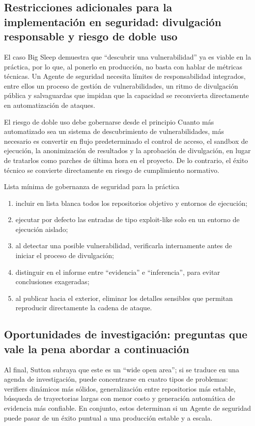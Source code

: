 \subsection{Restricciones adicionales para la implementación en seguridad: divulgación responsable y riesgo de doble uso}
El caso Big Sleep demuestra que ``descubrir una vulnerabilidad'' ya es viable en la práctica, por lo que, al ponerlo en producción, no basta con hablar de métricas técnicas. Un Agente de seguridad necesita límites de responsabilidad integrados, entre ellos un proceso de gestión de vulnerabilidades, un ritmo de divulgación pública y salvaguardas que impidan que la capacidad se reconvierta directamente en automatización de ataques.

\begin{warningbox}{El riesgo de doble uso debe gobernarse desde el principio}
Cuanto más automatizado sea un sistema de descubrimiento de vulnerabilidades, más necesario es convertir en flujo predeterminado el control de acceso, el sandbox de ejecución, la anonimización de resultados y la aprobación de divulgación, en lugar de tratarlos como parches de última hora en el proyecto. De lo contrario, el éxito técnico se convierte directamente en riesgo de cumplimiento normativo.
\end{warningbox}

\begin{importantbox}{Lista mínima de gobernanza de seguridad para la práctica}
\begin{enumerate}
    \item incluir en lista blanca todos los repositorios objetivo y entornos de ejecución;
    \item ejecutar por defecto las entradas de tipo exploit-like solo en un entorno de ejecución aislado;
    \item al detectar una posible vulnerabilidad, verificarla internamente antes de iniciar el proceso de divulgación;
    \item distinguir en el informe entre ``evidencia'' e ``inferencia'', para evitar conclusiones exageradas;
    \item al publicar hacia el exterior, eliminar los detalles sensibles que permitan reproducir directamente la cadena de ataque.
\end{enumerate}
\end{importantbox}

\subsection{Oportunidades de investigación: preguntas que vale la pena abordar a continuación}
Al final, Sutton subraya que este es un ``wide open area''; si se traduce en una agenda de investigación, puede concentrarse en cuatro tipos de problemas: verifiers dinámicos más sólidos, generalización entre repositorios más estable, búsqueda de trayectorias largas con menor costo y generación automática de evidencia más confiable. En conjunto, estos determinan si un Agente de seguridad puede pasar de un éxito puntual a una producción estable y a escala.

